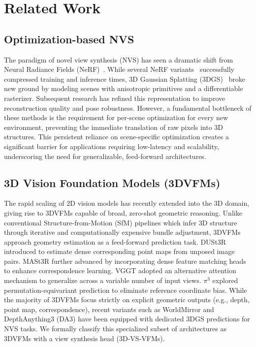 \section{Related Work}
\label{sec:related_work}

\subsection{Optimization-based NVS}

The paradigm of novel view synthesis (NVS) has seen a dramatic shift from Neural Radiance Fields (NeRF)~\cite{mildenhall2020nerf}. 
While several NeRF variants~\cite{yu2021plenoctrees, fridovich2022plenoxels, muller2022instant, tensorf, 10504815} successfully compressed training and inference times, 3D Gaussian Splatting (3DGS)~\cite{kerbl20233d} broke new ground by modeling scenes with anisotropic primitives and a differentiable rasterizer.
Subsequent research \cite{yu2024mip, huang20242d, fu2024colmap} has refined this representation to improve reconstruction quality and pose robustness.
However, a fundamental bottleneck of these methods is the requirement for per-scene optimization for every new environment, preventing the immediate translation of raw pixels into 3D structures. 
This persistent reliance on scene-specific optimization creates a significant barrier for applications requiring low-latency and scalability, underscoring the need for generalizable, feed-forward architectures.

\subsection{3D Vision Foundation Models (3DVFMs)}
\label{sec:related_works_3DVFM}
The rapid scaling of 2D vision models has recently extended into the 3D domain, giving rise to 3DVFMs capable of broad, zero-shot geometric reasoning. Unlike conventional Structure-from-Motion (SfM) pipelines \cite{schonberger2016structure, DBLP:journals/tog/SnavelySS06} which infer 3D structure through iterative and computationally expensive bundle adjustment, 3DVFMs approach geometry estimation as a feed-forward prediction task. 
DUSt3R \cite{wang2024dust3r} introduced to estimate dense corresponding point maps from unposed image pairs. 
MASt3R \cite{mast3r_eccv24} further advanced by incorporating dense feature matching heads to enhance correspondence learning. 
VGGT \cite{wang2025vggt} adopted an alternative attention mechanism to generalize across a variable number of input views. 
$\pi^3$ \cite{wang2025pi3} explored permutation-equivariant prediction to eliminate reference coordinate bias.
While the majority of 3DVFMs focus strictly on explicit geometric outputs (e.g., depth, point map, correspondence), recent variants such as WorldMirror \cite{liu2025worldmirror} and DepthAnything3 (DA3) \cite{lin2025da3} have been equipped with dedicated 3DGS predictions for NVS tasks. 
We formally classify this specialized subset of architectures as 3DVFMs with a view synthesis head (3D-VS-VFMs).

